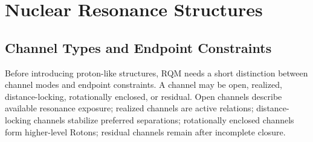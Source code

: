 \documentclass[11pt,a4paper]{article}
\begin{document}





\section{Nuclear Resonance Structures}





\subsection{Channel Types and Endpoint Constraints}

Before introducing proton-like structures, RQM needs a short distinction between channel modes and endpoint constraints. A channel may be open, realized, distance-locking, rotationally enclosed, or residual. Open channels describe available resonance exposure; realized channels are active relations; distance-locking channels stabilize preferred separations; rotationally enclosed channels form higher-level Rotons; residual channels remain after incomplete closure.
\end{document}
